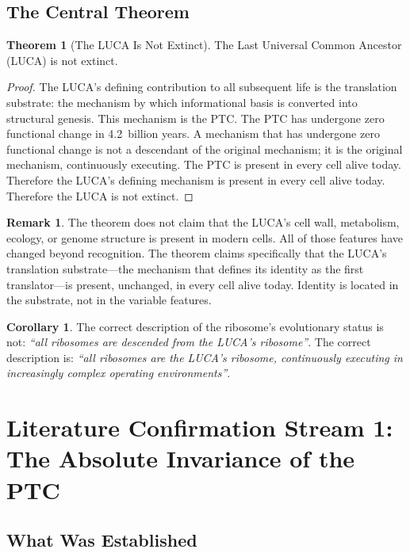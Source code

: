 \documentclass[11pt]{article}
\theoremstyle{definition}
\newtheorem{theorem}{Theorem}[section]
\newtheorem{corollary}{Corollary}[theorem]
\newtheorem{remark}{Remark}[section]
\begin{document}
\subsection{The Central Theorem}

\begin{theorem}[The LUCA Is Not Extinct]
\label{thm:luca}
The Last Universal Common Ancestor (LUCA) is not extinct.

\begin{proof}
The LUCA's defining contribution to all subsequent life is the
translation substrate: the mechanism by which informational basis
is converted into structural genesis.
This mechanism is the PTC.
The PTC has undergone zero functional change in 4.2~billion years.
A mechanism that has undergone zero functional change is not a
descendant of the original mechanism; it is the original mechanism,
continuously executing.
The PTC is present in every cell alive today.
Therefore the LUCA's defining mechanism is present in every cell
alive today.
Therefore the LUCA is not extinct.
\end{proof}
\end{theorem}

\begin{remark}
The theorem does not claim that the LUCA's cell wall, metabolism,
ecology, or genome structure is present in modern cells.
All of those features have changed beyond recognition.
The theorem claims specifically that the LUCA's translation
substrate---the mechanism that defines its identity as the first
translator---is present, unchanged, in every cell alive today.
Identity is located in the substrate, not in the variable features.
\end{remark}

\begin{corollary}
The correct description of the ribosome's evolutionary status is not:
\emph{``all ribosomes are descended from the LUCA's ribosome''}.
The correct description is:
\emph{``all ribosomes are the LUCA's ribosome, continuously executing
in increasingly complex operating environments''}.
\end{corollary}

\section{Literature Confirmation Stream 1:\\
The Absolute Invariance of the PTC}
\label{sec:literature1}

\subsection{What Was Established}
\end{document}
